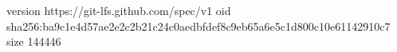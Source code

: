 version https://git-lfs.github.com/spec/v1
oid sha256:ba9c1e4d57ae2e2c2b21c24c0aedbfdef8c9eb65a6e5c1d800c10e61142910c7
size 144446
